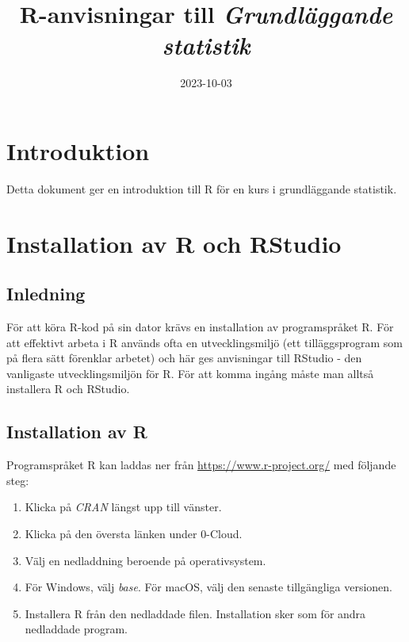 \documentclass[
]{book}
\title{R-anvisningar till \emph{Grundläggande statistik}}
\author{}
\date{\vspace{-2.5em}2023-10-03}
\providecommand{\tightlist}{%
  \setlength{\itemsep}{0pt}\setlength{\parskip}{0pt}}
\theoremstyle{definition}
\theoremstyle{definition}
\theoremstyle{definition}
\theoremstyle{definition}
\theoremstyle{remark}
\begin{document}
\maketitle

{
\setcounter{tocdepth}{1}
\tableofcontents
}
\hypertarget{introduktion}{%
\chapter*{Introduktion}\label{introduktion}}

Detta dokument ger en introduktion till R för en kurs i grundläggande statistik.

\hypertarget{installation-av-r-och-rstudio}{%
\chapter*{Installation av R och RStudio}\label{installation-av-r-och-rstudio}}

\hypertarget{inledning}{%
\section{Inledning}\label{inledning}}

För att köra R-kod på sin dator krävs en installation av programspråket R. För att effektivt arbeta i R används ofta en utvecklingsmiljö (ett tilläggsprogram som på flera sätt förenklar arbetet) och här ges anvisningar till RStudio - den vanligaste utvecklingsmiljön för R. För att komma ingång måste man alltså installera R och RStudio.

\hypertarget{installation-av-r}{%
\section{Installation av R}\label{installation-av-r}}

Programspråket R kan laddas ner från \url{https://www.r-project.org/} med följande steg:

\begin{enumerate}
\def\labelenumi{\arabic{enumi}.}
\tightlist
\item
  Klicka på \emph{CRAN} längst upp till vänster.
\item
  Klicka på den översta länken under 0-Cloud.
\item
  Välj en nedladdning beroende på operativsystem.
\item
  För Windows, välj \emph{base}. För macOS, välj den senaste tillgängliga versionen.
\item
  Installera R från den nedladdade filen. Installation sker som för andra nedladdade program.
\end{enumerate}
\end{document}
